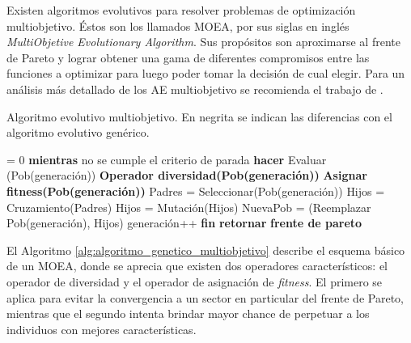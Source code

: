 Existen algoritmos evolutivos para resolver problemas de optimización multiobjetivo. 
Éstos son los llamados MOEA, por sus siglas en inglés \emph{ MultiObjetive Evolutionary Algorithm}. Sus propósitos son aproximarse al frente de Pareto y lograr obtener una gama de diferentes compromisos entre las funciones a optimizar para luego poder tomar la decisión de cual elegir. Para un análisis más detallado de los AE multiobjetivo se recomienda el trabajo de \citet{Deb2001}.


\begin{algorithm}[ht]
	\caption[Algoritmo evolutivo multiobjetivo]{Algoritmo evolutivo multiobjetivo. En negrita se indican las diferencias con el algoritmo evolutivo genérico.}
	\label{alg:algoritmo_genetico_multiobjetivo}
	\begin{algorithmic} [1] 
		{
			 = 0
			\STATE \textbf{mientras} {no se cumple el criterio de parada} \textbf{hacer}
			\STATE\hspace{\algorithmicindent} {Evaluar (Pob(generación))}
			\STATE\hspace{\algorithmicindent} \textbf{Operador diversidad(Pob(generación))}
			\STATE\hspace{\algorithmicindent} \textbf{Asignar fitness(Pob(generación))}						
			\STATE\hspace{\algorithmicindent} {Padres = Seleccionar(Pob(generación))}
			\STATE\hspace{\algorithmicindent} {Hijos = Cruzamiento(Padres)}
			\STATE\hspace{\algorithmicindent} {Hijos = Mutación(Hijos)}
			\STATE\hspace{\algorithmicindent} {NuevaPob = (Reemplazar Pob(generación), Hijos)}
			\STATE\hspace{\algorithmicindent} {generación}++
			\STATE \textbf{fin}
			\STATE \textbf{retornar} \textbf{frente de pareto}
		}
	\end{algorithmic}
\end{algorithm}


El Algoritmo \ref{alg:algoritmo_genetico_multiobjetivo} describe el esquema básico de un MOEA, donde se aprecia que existen dos operadores característicos: el operador de diversidad y el operador de asignación de \emph{fitness}. El primero se aplica para evitar la convergencia a un sector en particular del frente de Pareto, mientras que el segundo intenta brindar mayor chance de perpetuar a los individuos con mejores características.

